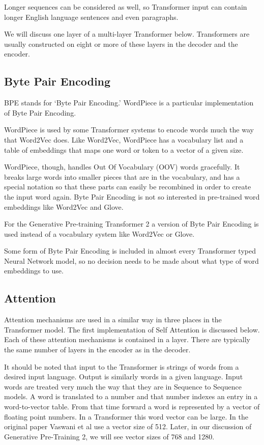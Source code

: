 Longer sequences can be considered as well, so Transformer input can contain longer English language sentences and even paragraphs. 

We will discuss one layer of a multi-layer Transformer below. Transformers are usually constructed on eight or more of these layers in the decoder and the encoder.

\subsection{Byte Pair Encoding}

\ac{BPE} stands for `Byte Pair Encoding.' WordPiece is a particular implementation of Byte Pair Encoding.

WordPiece is used by some Transformer systems to encode words much the way that Word2Vec does. Like Word2Vec, WordPiece  has a vocabulary list and a table of embeddings that maps one word or token to a vector of a given size.

WordPiece, though, handles Out Of Vocabulary (\ac{OOV}) words gracefully. It breaks large words into smaller pieces that are in the vocabulary, and has a special notation so that these parts can easily be recombined in order to create the input word again. Byte Pair Encoding is not so interested in pre-trained word embeddings like Word2Vec and Glove.

For the Generative Pre-training Transformer 2 a version of Byte Pair Encoding is used instead of a vocabulary system like Word2Vec or Glove.

Some form of Byte Pair Encoding is included in almost every Transformer typed Neural Network model, so no decision needs to be made about what type of word embeddings to use.

\subsection{Attention}
Attention mechanisms are used in a similar way in three places in the Transformer model. The first implementation of Self Attention is discussed below. Each of these attention mechanisms is contained in a layer. There are typically the same number of layers in the encoder as in the decoder.

It should be noted that input to the Transformer is strings of words from a desired input language. Output is similarly words in a given language. Input words are treated very much the way that they are in Sequence to Sequence models. A word is translated to a number and that number indexes an entry in a word-to-vector table. From that time forward a word is represented by a vector of floating point numbers. In a Transformer this word vector can be large. In the original paper Vaswani et al \cite{Vaswani2017AttentionIA} use a vector size of 512. Later, in our discussion of Generative Pre-Training 2, we will see vector sizes of 768 and 1280.

